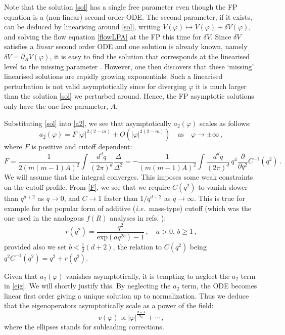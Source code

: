 \documentclass[11pt,a4paper]{article}
\numberwithin{figure}{section}
\numberwithin{equation}{section}
\newcommand{\be}{\begin{equation}}
\newcommand{\ee}{\end{equation}}
\newcommand\ie{\textit{i.e.}\ }
\newcommand{\ph}{\varphi}
\newcommand{\half}{\tfrac{1}{2}}
\begin{document}
Note that the solution \eqref{sol} has a single free parameter even though the FP equation is a (non-linear) second order ODE. The second parameter, if it exists, can be deduced by linearising around \eqref{sol}, writing $V(\ph)\mapsto V(\ph)+\delta V(\ph)$, and solving the flow equation \eqref{flowLPA} at the FP this time for $\delta V$. Since $\delta V$ satisfies a \emph{linear} second order ODE and one solution is already known, namely $\delta V = \partial_A V(\ph)$, it is easy to find the solution that corresponds at the linearised level to the missing parameter \cite{Morris:1994ki,Morris:1994ie}.  However, one then discovers that these `missing' linearised solutions are rapidly growing exponentials. Such a linearised perturbation is not valid asymptotically since for diverging $\ph$ it is much larger than the solution \eqref{sol} we perturbed around. Hence, the FP asymptotic solutions only have the one free parameter, $A$. 

Substituting \eqref{sol} into \eqref{a2}, we see that asymptotically $a_2(\ph)$ scales as follows:
\begin{equation}
    a_2(\ph) = F\,|\ph|^{2(2-m)} + O\left( |\ph|^{3(2-m)}\right) \quad \text{as} \quad \ph \rightarrow \pm \infty \,, \label{limA2}
\end{equation}
where $F$ is positive and cutoff dependent:
\begin{equation}
\label{F}
   F = \frac{1}{2\left(m(m-1)A\right)^2}  \int \frac{d^d q}{(2\pi)^d}\frac{\Dot{\Delta}}{\Delta^2} 
   = - \frac{1}{\left(m(m-1)A\right)^2} \int \frac{d^d q}{(2\pi)^d} \,q^4\frac{\partial}{\partial q^2} C^{-1}(q^2) \,.   
\end{equation}
We will assume that the integral converges. This imposes some weak constraints on the cutoff profile. From \eqref{F}, we see that we require  $C(q^2)$ to vanish slower than $q^{d+2}$ as $q\to0$, and $C\to1$ faster than $1/q^{d+2}$ as $q\to\infty$. This is true for example for the popular form of additive (\ie mass-type) cutoff \cite{Wetterich:1992} (which was the one used in the analogous $f(R)$ analyses in refs. \cite{Mitchell:2021qjr,Morris:2022btf}):
\begin{equation}
\label{wet}
    r(q^2)=\frac{q^2}{\text{exp}(aq^{2b})-1}\,, \quad a>0,\,b\geq 1 \,,
\end{equation}
provided also we set $b<\half(d+2)$, the relation to $C(q^2)$ being $q^2C^{-1}(q^2) = q^2 +r(q^2)$. 





Given that $a_2(\ph)$ vanishes asymptotically, it is tempting to neglect the $a_2$ term in \eqref{eig}. We will shortly justify this. By neglecting the $a_2 $ term, the ODE becomes linear first order giving a unique solution up to normalization. Thus we deduce that the eigenoperators asymptotically scale as a power of the field:
\be \label{asympv} v(\ph) \propto |\ph|^{\frac{d-\lambda}{d_\ph}} +\cdots\,, \ee
where the ellipses stands for subleading corrections. 
\end{document}
